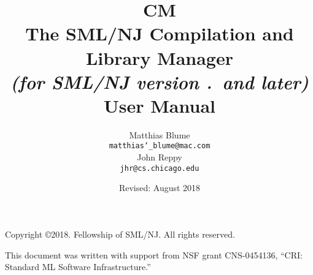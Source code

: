 \documentclass[titlepage,letterpaper]{article}
\author{
  Matthias Blume \\
  \texttt{matthias\char`\_blume@mac.com}\\[0.5em]
  John Reppy\\
  \texttt{jhr@cs.chicago.edu}}
\date{Revised: August 2018}
\title{
  \textbf{CM}\\
  The SML/NJ Compilation and Library Manager \\
  \textit{\small (for SML/NJ version \smlmj.\smlmn~and later)} \\
  User Manual
}
\begin{document}



\maketitle

\phantom{.}
\thispagestyle{empty}

\noindent Copyright \copyright{}2018.  Fellowship of SML/NJ.  All rights reserved.

\vskip 12pt
\noindent This document was written with support from NSF grant CNS-0454136,
``CRI: Standard ML Software Infrastructure.''

\pagebreak

\tableofcontents

\pagebreak



















\pagebreak



\pagebreak

\appendix









\end{document}
